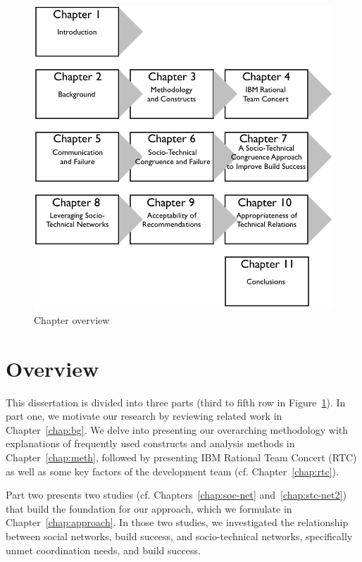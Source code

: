 \begin{figure}[t]
\centering
\includegraphics[width=.87\columnwidth]{figures/dis-over}
\caption{Chapter overview}
\label{fig:over}
\end{figure}

\section{Overview}
This dissertation is divided into three parts (third to fifth row in Figure~\ref{fig:over}).
In part one, we motivate our research by reviewing related work in Chapter~\ref{chap:bg}.
We delve into presenting our overarching methodology with explanations of frequently used constructs and analysis methods in Chapter~\ref{chap:meth}, followed by presenting IBM Rational Team Concert (RTC) as well as some key factors of the development team (cf. Chapter~\ref{chap:rtc}).

Part two presents two studies (cf. Chapters~\ref{chap:soc-net} and~\ref{chap:stc-net2}) that build the foundation for our approach, which we formulate in Chapter~\ref{chap:approach}.
In those two studies, we investigated the relationship between social networks, build success, and socio-technical networks, specifically unmet coordination needs, and build success.

